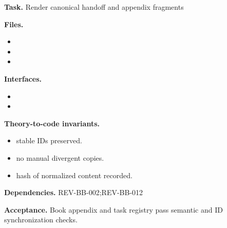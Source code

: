 \begin{statusbox}[CODE-BB-014]
\textbf{Task.} Render canonical handoff and appendix fragments\par
\textbf{Files.}
\begin{itemize}[leftmargin=1.7em,itemsep=1.5pt,topsep=2pt]
\item {}
\item {}
\item {}
\end{itemize}
\textbf{Interfaces.}
\begin{itemize}[leftmargin=1.7em,itemsep=1.5pt,topsep=2pt]
\item {}
\item {}
\end{itemize}
\textbf{Theory-to-code invariants.}
\begin{itemize}[leftmargin=1.7em,itemsep=1.5pt,topsep=2pt]
\item stable IDs preserved.
\item no manual divergent copies.
\item hash of normalized content recorded.
\end{itemize}
\textbf{Dependencies.} REV-BB-002;REV-BB-012\par
\textbf{Acceptance.} Book appendix and task registry pass semantic and ID synchronization checks.
\end{statusbox}

